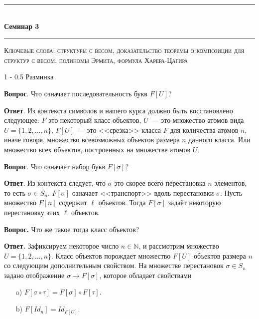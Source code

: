 \documentclass{article}
\makeatletter
\def \topic {Семинар 3}
\theoremstyle{definition}
\renewcommand{\section}{\@startsection
{section}%
{1}%
{\z@}%
{-\baselineskip}%
{0.5\baselineskip}%
{\centering\large\scshape}} %
\makeatother
\begin{document}
\begin{center}

\newcommand{\HRule}{\rule{\linewidth}{0.5mm}}
\HRule \\[0.2cm]
{ \Large \bfseries \topic} %
\HRule

\end{center}

\textsc{Ключевые слова: 
структуры с весом, доказательство теоремы о композиции для структур с весом,
полиномы Эрмита, формула Харера-Цагира
}

\section{Разминка}

\textbf{Вопрос}. Что означает последовательность букв \( F[U] \)?

\textbf{Ответ}. Из контекста символов и нашего курса должно быть
восстановлено следующее: \( F \) это некоторый класс объектов, \( U \)~--- это
множество атомов вида \( U = \{ 1, 2, \ldots, n \} \), \( F[U] \)~--- это
<<срезка>> класса \( F \) для количества атомов \( n \), иначе говоря, множество
всевозможных объектов размера \( n \) данного класса. Или множество всех
объектов, построенных на множестве атомов \( U \).

\textbf{Вопрос}. Что означает набор букв \( F[\sigma] \)?

\textbf{Ответ}. Из контекста следует, что \( \sigma \) это скорее всего
перестановка \( n \) элементов, то есть \( \sigma \in S_n \). \( F[\sigma]\)
означает <<транспорт>> вдоль перестановки \( \sigma \). Пусть множество \( F[n]
\) содержит \( \ell \) объектов. Тогда \( F[\sigma] \) задаёт некоторую
перестановку этих \( \ell \) объектов.

\textbf{Вопрос.} Что же такое тогда класс объектов?

\textbf{Ответ.} Зафиксируем некоторое число \( n \in \mathbb N \), и рассмотрим
множество \( U = \{ 1, 2, \ldots, n \} \). Класс объектов порождает множество \(
F[U] \) объектов размера \( n \) со следующим дополнительным свойством. На
множестве перестановок \( \sigma \in
S_n \) задано отображение \( \sigma \to F[\sigma] \), которое обладает
свойствами
\begin{enumerate}
 \item[a)] \( F[\sigma \circ \tau] = F[\sigma]\circ F[\tau] \).
 \item[b)] \( F[Id_n] = Id_{F[U]} \). 
\end{enumerate}
\end{document}

